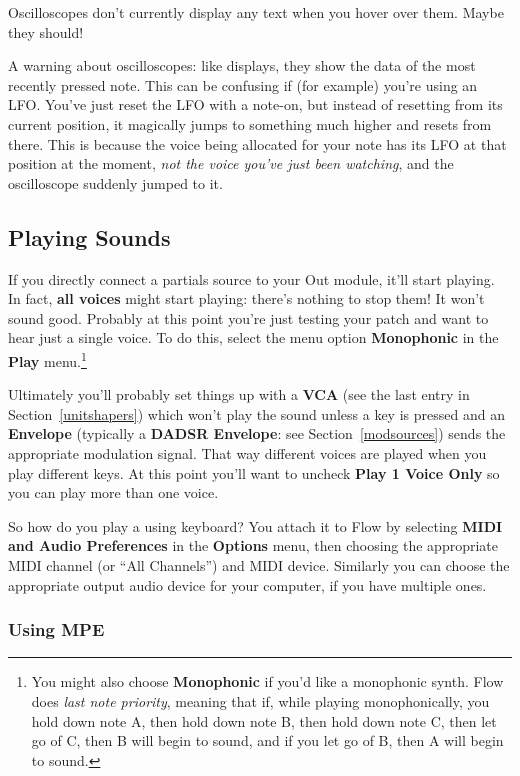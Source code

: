 \documentclass{article}
\newcommand\name{Flow}
\begin{document}
Oscilloscopes don't currently display any text when you hover over them.  Maybe they should!

A warning about oscilloscopes: like displays, they show the data of the most recently pressed note.  This can be confusing if (for example) you're using an LFO.  You've just reset the LFO with a note-on, but instead of resetting from its current position, it magically jumps to something much higher and resets from there.  This is because the voice being allocated for your note has its LFO at that position at the moment, {\it not the voice you've just been watching}, and the oscilloscope suddenly jumped to it.

\subsection{Playing Sounds}

If you directly connect a partials source to your Out module, it'll start playing.  In fact, {\bf all voices} might start playing: there's nothing to stop them!  It won't sound good.   Probably at this point you're just testing your patch and want to hear just a single voice.  To do this, select the menu option {\bf Monophonic} in the {\bf Play} menu.\footnote{You might also choose {\bf Monophonic} if you'd like a monophonic synth.  Flow does {\it last note priority}, meaning that if, while playing monophonically, you hold down note A, then hold down note B, then hold down note C, then let go of C, then B will begin to sound, and if you let go of B, then A will begin to sound.}

Ultimately you'll probably set things up with a {\bf VCA} (see the last entry in Section~\ref{unitshapers}) which won't play the sound unless a key is pressed and an {\bf Envelope} (typically a {\bf DADSR Envelope}: see Section~\ref{modsources}) sends the appropriate modulation signal.  That way different voices are played when you play different keys.  At this point you'll want to uncheck {\bf Play 1 Voice Only} so you can play more than one voice.

So how do you play a using keyboard?  You attach it to {\name} by selecting {\bf MIDI and Audio Preferences} in the {\bf Options} menu, then choosing the appropriate MIDI channel (or ``All Channels'') and MIDI device.  Similarly you can choose the appropriate output audio device for your computer, if you have multiple ones.

\subsubsection{Using MPE}
\end{document}
